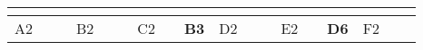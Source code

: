 \begin{landscape}
\begin{table}[h!]
\begin{tabular}{lcllcllcllcllcllcl}
                          & \multicolumn{1}{l}{}                                                                                                     &                              &                                                 & \multicolumn{1}{l}{}                                                                                                                                &                                                       &                         & \multicolumn{1}{l}{}                                                                                                     &                               &                                                 & \multicolumn{1}{l}{}                                                                                                                      &                                                       &                         & \multicolumn{1}{l}{}                                                                                                                &                               &                                                 & \multicolumn{1}{l}{}                                                                                                                                  &                                                       \\ \hline
\multicolumn{1}{|l|}{A2}  & \multicolumn{1}{c|}{}                                                                                                    & \multicolumn{1}{l|}{}        & \multicolumn{1}{l|}{\cellcolor[HTML]{C0C0C0}B2} & \multicolumn{1}{c|}{\cellcolor[HTML]{C0C0C0}}                                                                                                       & \multicolumn{1}{l|}{\cellcolor[HTML]{C0C0C0}{\bf A2}} & \multicolumn{1}{l|}{C2} & \multicolumn{1}{c|}{}                                                                                                    & \multicolumn{1}{l|}{{\bf B3}} & \multicolumn{1}{l|}{\cellcolor[HTML]{C0C0C0}D2} & \multicolumn{1}{c|}{\cellcolor[HTML]{C0C0C0}}                                                                                             & \multicolumn{1}{l|}{\cellcolor[HTML]{C0C0C0}}         & \multicolumn{1}{l|}{E2} & \multicolumn{1}{c|}{}                                                                                                               & \multicolumn{1}{l|}{{\bf D6}} & \multicolumn{1}{l|}{\cellcolor[HTML]{C0C0C0}F2} & \multicolumn{1}{c|}{\cellcolor[HTML]{C0C0C0}}                                                                                                         & \multicolumn{1}{l|}{\cellcolor[HTML]{C0C0C0}}         \\ \cline{1-1} \cline{3-4} \cline{6-7} \cline{9-10} \cline{12-13} \cline{15-16} \cline{18-18} 

\end{tabular}
\end{table}
\end{landscape}
